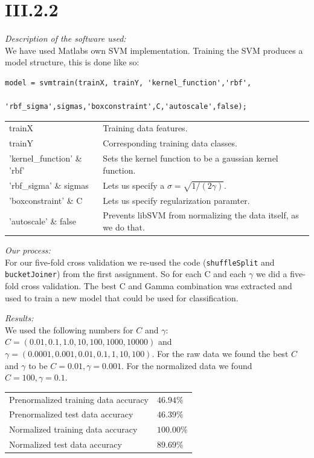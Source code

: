 \section*{III.2.2}

\textit{Description of the software used:}\\
We have used Matlabs own SVM implementation.
Training the SVM produces a model structure, this is done like so:
\begin{verbatim}
model = svmtrain(trainX, trainY, 'kernel_function','rbf',
                 'rbf_sigma',sigmas,'boxconstraint',C,'autoscale',false);
\end{verbatim}

\begin{tabular}{|l l|}
\hline
trainX                      & Training data features.\\
trainY                      & Corresponding training data classes.\\
'kernel\_function' \& 'rbf' & Sets the kernel function to be a gaussian kernel function.\\
'rbf\_sigma' \& sigmas      & Lets us specify a $\sigma = \sqrt{1/(2\gamma)}$.\\
'boxconstraint' \& C        & Lets us specify regularization paramter.\\
'autoscale' \& false        & Prevents libSVM from normalizing the data itself, as we do that.\\\hline
\end{tabular}

\noindent \textit{Our process:}\\
For our five-fold cross validation we re-used the code (\texttt{shuffleSplit}
and \texttt{bucketJoiner}) from the first assignment. So for each C and each
$\gamma$ we did a five-fold cross validation. The best C and Gamma combination
was extracted and used to train a new model that could be used for
classification.

\noindent \textit{Results:}\\
We used the following numbers for $C$ and $\gamma$: $C = (0.01, 0.1, 1.0, 10,
100, 1000, 10000)$ and $\gamma = (0.0001, 0.001, 0.01, 0.1, 1, 10, 100)$. For
the raw data we found the best $C$ and $\gamma$ to be $C=0.01,
\gamma=0.001$. For the normalized data we found $C=100, \gamma=0.1$.

\begin{tabular}{l l}
Prenormalized training data accuracy & $ 46.94\%$\\
Prenormalized test data accuracy     & $ 46.39\%$\\
Normalized training data accuracy    & $100.00\%$\\
Normalized test data accuracy        & $ 89.69\%$\\
\end{tabular}

